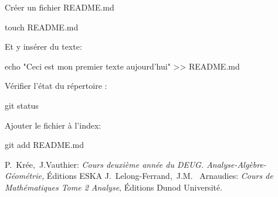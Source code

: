\documentclass[11pt, a4paper]{book}
\begin{document}
Créer un fichier README.md
\begin{bash}
touch README.md
\end{bash}
Et y insérer du texte:
\begin{bash}
echo "Ceci est mon premier texte aujourd'hui" >> README.md
\end{bash}
Vérifier l'état du répertoire :
\begin{bash}
git status
\end{bash}
Ajouter le fichier à l'index:
\begin{bash}
git add README.md
\end{bash}

\begin{thebibliography}{99} 
 P.~Kr\'ee,~J.Vauthier: \emph{Cours deuxi\`eme ann\'ee du DEUG. Analyse-Alg\`ebre-G\'eom\'etrie,}  
\'Editions ESKA 
 J.~Lelong-Ferrand,~J.M. ~Arnaudies: \emph{Cours de Math\'ematiques Tome 2 Analyse},  
\'Editions Dunod Universit\'e.
\end{thebibliography}
\end{document}
